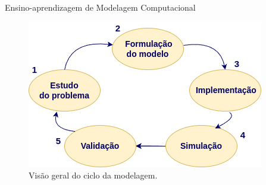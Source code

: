 \begin{frame}{Ensino-aprendizagem de Modelagem Computacional}
    \begin{figure}[h]
        \centering
        \includegraphics[scale=0.5]{imgs/ciclo-modelagem.png} 
        \caption{Visão geral do ciclo da modelagem.}
        \label{fig:ciclo-modelagem}
    \end{figure}
\end{frame}
